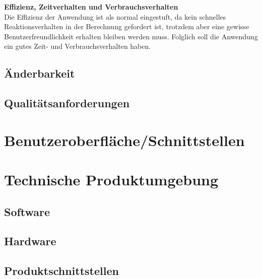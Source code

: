 \documentclass[parskip=full]{scrartcl} %
\begin{document}
\textbf{Effizienz, Zeitverhalten und Verbrauchsverhalten}\\
Die Effizienz der Anwendung ist als normal eingestuft, da kein schnelles Reaktionsverhalten in der Berechnung gefordert ist, trotzdem aber eine gewisse Benutzerfreundlichkeit erhalten bleiben werden muss. Folglich soll die Anwendung ein gutes Zeit- und Verbrauchsverhalten haben.
\subsection{Änderbarkeit}
\subsection{Qualitätsanforderungen}


\newpage



\section{Benutzeroberfläche/Schnittstellen}
\newpage



\section{Technische Produktumgebung}

\subsection{Software}
\subsection{Hardware}
\subsection{Produktschnittstellen}
\newpage
\end{document}
